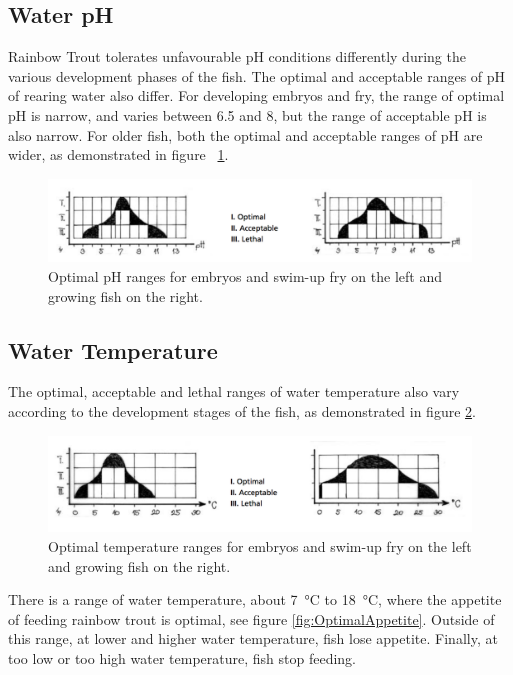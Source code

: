\subsection{Water pH} 

Rainbow Trout tolerates unfavourable pH conditions differently during the various development phases of the fish. The optimal and acceptable ranges of pH of rearing water also differ. For developing embryos and fry, the range of optimal pH is narrow, and varies between 6.5 and 8, but the range of acceptable pH is also narrow. For older fish, both the optimal and acceptable ranges of pH are wider, as demonstrated in figure ~\ref{fig:OptimalPH}.

\begin{figure}[H]
  \centering
   \includegraphics[scale = 0.5]{images/OptimalPH.png}
  \caption{Optimal pH ranges for embryos and swim-up fry on the left and growing fish on the right.}
   \label{fig:OptimalPH}
\end{figure}


\subsection{Water Temperature} 

The optimal, acceptable and lethal ranges of water temperature also vary according to the development stages of the fish, as demonstrated in figure \ref{fig:OptimalTemp}.

\begin{figure}[H]
  \centering
   \includegraphics[scale = 0.5]{images/OptimalTemp.png}
  \caption{Optimal temperature ranges for embryos and swim-up fry on the left and growing fish on the right.}
   \label{fig:OptimalTemp}
\end{figure}


There is a range of water temperature, about \SI{7}{\celsius} to \SI{18}{\celsius}, where the appetite of feeding rainbow trout is optimal, see figure \ref{fig:OptimalAppetite}. Outside of this range, at lower and higher water temperature, fish lose appetite. Finally, at too low or too high water temperature, fish stop feeding.

